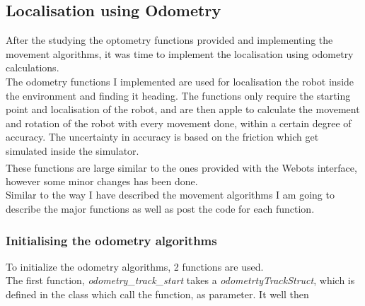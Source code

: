 \documentclass[10pt,a4paper]{article}
\begin{document}
\begin{flushleft}
\subsection{Localisation using Odometry}
After the studying the optometry functions provided and implementing the movement algorithms, it was time to implement the localisation using odometry calculations.\\
The odometry functions I implemented are used for localisation the robot inside the environment and finding it heading. The functions only require the starting point and localisation of the robot, and are then apple to calculate the movement and rotation of the robot with every movement done, within a certain degree of accuracy. The uncertainty in accuracy is based on the friction which get simulated inside the simulator. \\
These functions are large similar to the ones provided with the Webots\textsuperscript{\texttrademark} interface, however some minor changes has been done. \\
Similar to the way I have described the movement algorithms I am going to describe the major functions as well as post the code for each function.\\

\subsubsection{Initialising the odometry algorithms}
To initialize the odometry algorithms, 2 functions are used. \\
The first function, \textit{odometry\_track\_start} takes a \textit{odometrtyTrackStruct}, which is defined in the class which call the function, as parameter. It well then 

\nocite{*}
\newpage

\end{flushleft}
\end{document}
